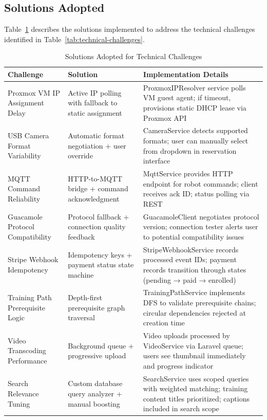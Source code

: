 \subsection{Solutions Adopted}

Table~\ref{tab:solutions-adopted} describes the solutions implemented to address the technical challenges identified in Table~\ref{tab:technical-challenges}.

\begin{table}[H]
\centering
\caption{Solutions Adopted for Technical Challenges}
\label{tab:solutions-adopted}
\begin{tabular}{|p{4cm}|p{4cm}|p{6.5cm}|}
\hline
\textbf{Challenge} & \textbf{Solution} & \textbf{Implementation Details} \\
\hline
Proxmox VM IP Assignment Delay & Active IP polling with fallback to static assignment & ProxmoxIPResolver service polls VM guest agent; if timeout, provisions static DHCP lease via Proxmox API \\
\hline
USB Camera Format Variability & Automatic format negotiation + user override & CameraService detects supported formats; user can manually select from dropdown in reservation interface \\
\hline
MQTT Command Reliability & HTTP-to-MQTT bridge + command acknowledgment & MqttService provides HTTP endpoint for robot commands; client receives ack ID; status polling via REST \\
\hline
Guacamole Protocol Compatibility & Protocol fallback + connection quality feedback & GuacamoleClient negotiates protocol version; connection tester alerts user to potential compatibility issues \\
\hline
Stripe Webhook Idempotency & Idempotency keys + payment status state machine & StripeWebhookService records processed event IDs; payment records transition through states (pending → paid → enrolled) \\
\hline
Training Path Prerequisite Logic & Depth-first prerequisite graph traversal & TrainingPathService implements DFS to validate prerequisite chains; circular dependencies rejected at creation time \\
\hline
Video Transcoding Performance & Background queue + progressive upload & Video uploads processed by VideoService via Laravel queue; users see thumbnail immediately and progress indicator \\
\hline
Search Relevance Tuning & Custom database query analyzer + manual boosting & SearchService uses scoped queries with weighted matching; training content titles prioritized; captions included in search scope \\
\hline
\end{tabular}
\end{table}

